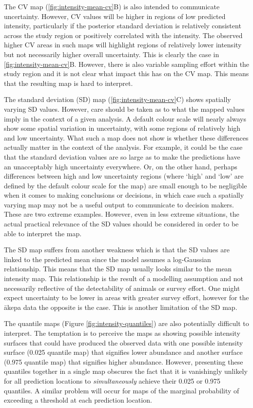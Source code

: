 \documentclass{stylefile16/statsoc}
\newcommand{\akepa}{\textquotesingle\={a}kepa}  %
\begin{document}
The CV map (\autoref{fig:intensity-mean-cv}B) is also intended to communicate uncertainty.  However, CV values will be higher in regions of low predicted intensity, particularly if the posterior standard deviation is relatively consistent across the study region or positively correlated with the intensity.  The observed higher CV areas in such maps will highlight regions of relatively lower intensity but not necessarily higher overall uncertainty.  This is clearly the case in \autoref{fig:intensity-mean-cv}B.  However, there is also variable sampling effort within the study region and it is not clear what impact this has on the CV map.  This means that the resulting map is hard to interpret.

The standard deviation (SD) map (\autoref{fig:intensity-mean-cv}C) shows spatially varying SD values.  However, care should be taken as to what the mapped values imply in the context of a given analysis.  A default colour scale will nearly always show some spatial variation in uncertainty, with some regions of relatively high and low uncertainty.  What such a map does not show is whether these differences actually matter in the context of the analysis.  For example, it could be the case that the standard deviation values are so large as to make the predictions have an unacceptably high uncertainty everywhere.  Or, on the other hand, perhaps differences between high and low uncertainty regions (where `high' and `low' are defined by the default colour scale for the map) are small enough to be negligible when it comes to making conclusions or decisions, in which case such a spatially varying map may not be a useful output to communicate to decision makers.  These are two extreme examples.  However, even in less extreme situations, the actual practical relevance of the SD values should be considered in order to be able to interpret the map.  

The SD map suffers from another weakness which is that the SD values are linked to the predicted mean since the model assumes a log-Gaussian relationship.  This means that the SD map usually looks similar to the mean intensity map.  This relationship is the result of a modelling assumption and not necessarily reflective of the detectability of animals or survey effort.  One might expect uncertainty to be lower in areas with greater survey effort, however for the \akepa{} data the opposite is the case.  This is another limitation of the SD map.  

The quantile maps (Figure \ref{fig:intensity-quantiles}) are also potentially difficult to interpret. The temptation is to perceive the maps as showing possible intensity surfaces that could have produced the observed data with one possible intensity surface (0.025 quantile map) that signifies lower abundance and another surface (0.975 quantile map) that signifies higher abundance.  However, presenting these quantiles together in a single map obscures the fact that it is vanishingly unlikely for all prediction locations to \textit{simultaneously} achieve their 0.025 or 0.975 quantiles.  A similar problem will occur for maps of the marginal probability of exceeding a threshold at each prediction location.  
\end{document}
